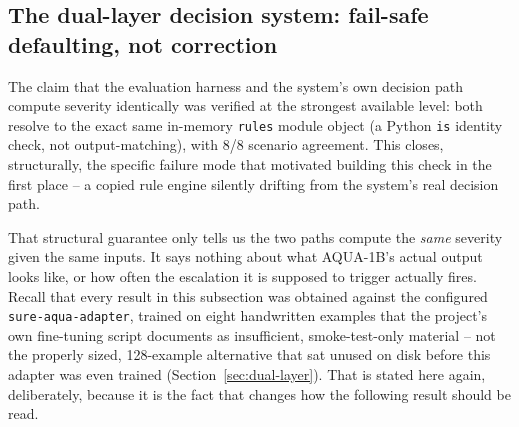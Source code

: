 \subsection{The dual-layer decision system: fail-safe defaulting, not correction}
\label{sec:results-dual-layer}

The claim that the evaluation harness and the system's own decision path compute severity identically was verified at
the strongest available level: both resolve to the exact same in-memory \texttt{rules} module
object (a Python \texttt{is} identity check, not output-matching), with 8/8 scenario agreement.
This closes, structurally, the specific failure mode that motivated building this check in the
first place -- a copied rule engine silently drifting from the system's real decision path.

That structural guarantee only tells us the two paths compute the \emph{same} severity given the
same inputs. It says nothing about what AQUA-1B's actual output looks like, or how often the
escalation it is supposed to trigger actually fires. Recall that every result in this subsection
was obtained against the configured \texttt{sure-aqua-adapter}, trained on eight handwritten examples
that the project's own fine-tuning script documents as insufficient, smoke-test-only material --
not the properly sized, 128-example alternative that sat unused on disk before this adapter was
even trained (Section~\ref{sec:dual-layer}). That is stated here again, deliberately, because it is
the fact that changes how the following result should be read.

